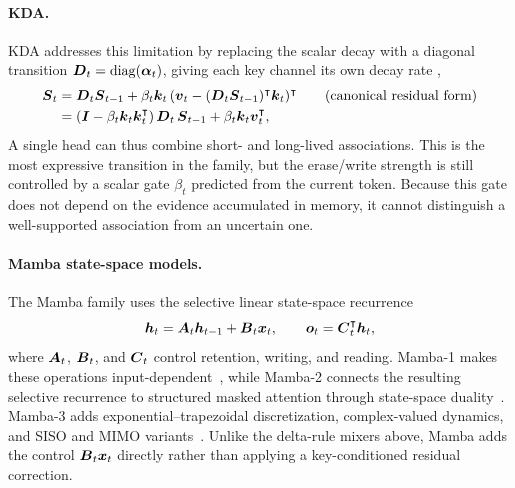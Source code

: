\documentclass[11pt,letterpaper,logo]{yalearxiv}
\begin{document}
\paragraph{KDA.}
KDA addresses this limitation by replacing the scalar decay with a diagonal transition
$\boldsymbol{D}_t=\operatorname{diag}(\boldsymbol{\alpha}_t)$, giving each key channel its own decay rate
\citep{kimiteam2025kimilinear},
  \begin{equation}
  \begin{aligned}
    \boldsymbol{S}_t
      &= \boldsymbol{D}_t \boldsymbol{S}_{t-1}
         + \beta_t \boldsymbol{k}_t\,(\boldsymbol{v}_t-(\boldsymbol{D}_t \boldsymbol{S}_{t-1})^{\intercal}\boldsymbol{k}_t)^{\intercal}
        \qquad\text{(canonical residual form)}\\
      &= (\boldsymbol{I}-\beta_t \boldsymbol{k}_t \boldsymbol{k}_t^{\intercal})\,\boldsymbol{D}_t\,\boldsymbol{S}_{t-1}
         + \beta_t \boldsymbol{k}_t \boldsymbol{v}_t^{\intercal},
  \end{aligned}
    \label{eq:kda}
  \end{equation}
  A single head can thus combine short- and long-lived associations. This is the most
  expressive transition in the family, but the erase/write strength is still controlled by a
  scalar gate $\beta_t$ predicted from the current token. Because this gate does not depend on
  the evidence accumulated in memory, it cannot distinguish a well-supported association from
  an uncertain one.

\paragraph{Mamba state-space models.}
The Mamba family uses the selective linear state-space recurrence
\begin{equation}
  \boldsymbol{h}_t
  = \boldsymbol{A}_t\boldsymbol{h}_{t-1}+\boldsymbol{B}_t\boldsymbol{x}_t,
  \qquad
  \boldsymbol{o}_t=\boldsymbol{C}_t^{\intercal}\boldsymbol{h}_t,
  \label{eq:mamba-ssm}
\end{equation}
where $\boldsymbol{A}_t$, $\boldsymbol{B}_t$, and $\boldsymbol{C}_t$ control retention, writing, and reading. Mamba-1
makes these operations input-dependent~\citep{gu2023mamba}, while Mamba-2 connects the resulting
selective recurrence to structured masked attention through state-space
duality~\citep{dao2024transformers}. Mamba-3 adds exponential--trapezoidal discretization,
complex-valued dynamics, and SISO and MIMO variants~\citep{lahoti2026mamba3}. Unlike the delta-rule
mixers above, Mamba adds the control $\boldsymbol{B}_t\boldsymbol{x}_t$ directly rather than applying a
key-conditioned residual correction.
\end{document}
